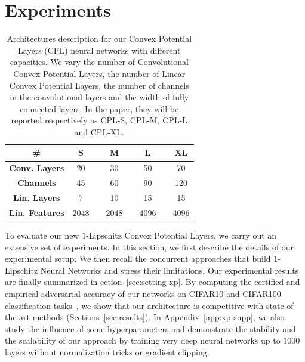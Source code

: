 \section{Experiments}
\label{section:experiments}
\begin{table}
\begin{center}
    \begin{tabular}{cccccccc}
    \toprule
    \textbf{\#} & \textbf{S} &  & \textbf{M} & & \textbf{L} & & \textbf{XL} \\
    \midrule
    \textbf{Conv. Layers}      & 20 & & 30 & & 50& & 70 \\
    \textbf{Channels}  &45 & & 60 & & 90 & & 120 \\ 
    \textbf{Lin. Layers}        &7 & & 10 & & 15 & & 15 \\
    \textbf{Lin. Features} & 2048 & & 2048 & & 4096 & & 4096 \\
    \bottomrule
    \end{tabular}%

\end{center}
\caption{\label{table:model-desc}
Architectures description for our Convex Potential Layers (CPL) neural networks with different capacities. We vary the number of Convolutional Convex Potential Layers, the number of Linear Convex Potential Layers, the number of channels in the convolutional layers and the width of fully
connected layers. In the paper, they will be reported respectively as CPL-S, CPL-M, CPL-L and CPL-XL.}
\end{table}

To evaluate our new $1$-Lipschitz Convex Potential Layers, we carry out an extensive set of experiments. In this section, we first describe  the details of our experimental setup. We then recall  the concurrent approaches that build $1$-Lipschitz Neural Networks and stress their limitations. Our experimental results are finally summarized in ection~\ref{sec:setting-xp}. By computing the certified and empirical adversarial  accuracy of our networks on CIFAR10 and CIFAR100 classification tasks~\citep{krizhevsky2009learning}, we show that our architecture is competitive with state-of-the-art methods (Sections~\ref{sec:results}). In Appendix~\ref{app:xp-supp}, we also study the influence of some hyperparameters and demonstrate the stability and the scalability of our approach by training very deep neural networks up to 1000 layers without normalization tricks or gradient clipping.










